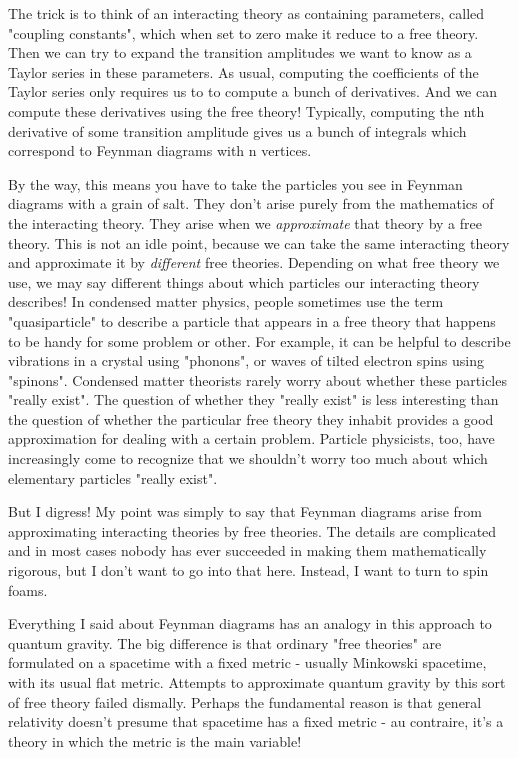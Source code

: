 The trick is to think of an interacting theory as containing parameters,
called "coupling constants", which when set to zero make it reduce
to a free theory.  Then we can try to expand the transition amplitudes
we want to know as a Taylor series in these parameters.  As usual,
computing the coefficients of the Taylor series only requires us to to
compute a bunch of derivatives.  And we can compute these derivatives
using the free theory!  Typically, computing the nth derivative of some
transition amplitude gives us a bunch of integrals which correspond to
Feynman diagrams with n vertices.   

By the way, this means you have to take the particles you see in Feynman
diagrams with a grain of salt.  They don't arise purely from the
mathematics of the interacting theory.  They arise when we \emph{approximate}
that theory by a free theory.  This is not an idle point, because we can
take the same interacting theory and approximate it by \emph{different} free
theories.  Depending on what free theory we use, we may say different
things about which particles our interacting theory describes!  In
condensed matter physics, people sometimes use the term
"quasiparticle" to describe a particle that appears in a free
theory that happens to be handy for some problem or other.  For example,
it can be helpful to describe vibrations in a crystal using
"phonons", or waves of tilted electron spins using
"spinons".  Condensed matter theorists rarely worry about
whether these particles "really exist".  The question of
whether they "really exist" is less interesting than the
question of whether the particular free theory they inhabit provides a
good approximation for dealing with a certain problem.  Particle
physicists, too, have increasingly come to recognize that we shouldn't
worry too much about which elementary particles "really
exist".

But I digress!  My point was simply to say that Feynman diagrams arise
from approximating interacting theories by free theories.  The details
are complicated and in most cases nobody has ever succeeded in making
them mathematically rigorous, but I don't want to go into that here.
Instead, I want to turn to spin foams.

Everything I said about Feynman diagrams has an analogy in this approach
to quantum gravity.  The big difference is that ordinary "free
theories" are formulated on a spacetime with a fixed metric -
usually Minkowski spacetime, with its usual flat metric.  Attempts to
approximate quantum gravity by this sort of free theory failed dismally.
Perhaps the fundamental reason is that general relativity doesn't
presume that spacetime has a fixed metric - au contraire, it's a theory
in which the metric is the main variable!

